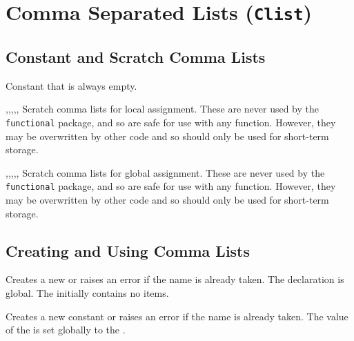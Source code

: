 \documentclass[oneside]{book}
\begin{document}
\chapter{Comma Separated Lists (\texttt{Clist})}

\section{Constant and Scratch Comma Lists}

\begin{variable}{\cEmptyClist}
Constant that is always empty.
\end{variable}

\begin{variable}{\lTmpaClist,\lTmpbClist,\lTmpcClist,\lTmpiClist,\lTmpjClist,\lTmpkClist}
Scratch comma lists for local assignment. These are never used by
the \verb!functional! package, and so are safe for use with any
function. However, they may be overwritten by other
code and so should only be used for short-term storage.
\end{variable}

\begin{variable}{\gTmpaClist,\gTmpbClist,\gTmpcClist,\gTmpiClist,\gTmpjClist,\gTmpkClist}
Scratch comma lists for global assignment. These are never used by
the \verb!functional! package, and so are safe for use with any
function. However, they may be overwritten by other
code and so should only be used for short-term storage.
\end{variable}

\section{Creating and Using Comma Lists}

\begin{function}{\clistNew}
\begin{syntax}
 
\end{syntax}
Creates a new  or raises an error if the name is
already taken. The declaration is global. The 
initially contains no items.
\begin{codehigh}
\clistNew \lFooSomeClist
\end{codehigh}
\end{function}

\begin{function}{\clistConst}
\begin{syntax}
  
\end{syntax}
Creates a new constant  or raises an error
if the name is already taken. The value of the
 is set globally to the
.
\begin{codehigh}
\clistConst {}
\end{codehigh}
\end{function}
\end{document}
